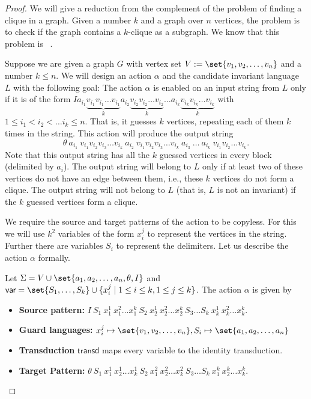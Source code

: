 \documentclass[12pt, a4paper]{article}
\newcommand{\var}{\textsf{var}}
\newcommand{\T}{\textsf{transd}}
\newcommand{\action}{\alpha}
\begin{document}
\begin{proof}
	We will give a reduction from the complement of the problem of finding a clique in a graph. Given a number $k$ and a graph over $n$
	vertices, the problem is to check if the graph contains a $k$-clique as a subgraph. We know that this problem is \npc\ \cite{K1972}.

Suppose we are given a graph $G$  with vertex set $V := \set{v_1, v_2, \dots, v_n}$ and  a number $k \leq 
n$. We will design an action $\action$ and the candidate invariant language $L$  with the following goal: The action $\action$  is enabled on an input string from $L$ only if it is of the form $ I a_{i_1} \underbrace{v_{i_1}v_{i_1}\dots 
v_{i_1}}_{k} a_{i_2} \underbrace{v_{i_2}v_{i_2}\dots 
v_{i_2}}_{k}\dots a_{i_k} \underbrace{v_{i_k}v_{i_k}\dots v_{i_k}}_{k}$  
with $1 \le i_1 < i_2 < \dots i_k \le n$.  That is, it guesses $k$ 
vertices, repeating each of them $k$ times in the string. This action 
will produce the output string $$\theta ~ a_{i_1} ~ v_{i_1} v_{i_2} 
v_{i_3} \dots v_{i_k} ~ a_{i_2} ~ v_{i_1}v_{i_2} v_{i_3} \dots  v_{i_k} ~ 
a_{i_3}~ \dots ~ a_{i_k} ~ v_{i_1}v_{i_2} \dots v_{i_k}. $$ Note that this 
output string has all the $k$ guessed vertices in every block 
(delimited by $a_i$). The output string will belong to $L$ only if at 
least two of these vertices do not have an edge between them, i.e., 
these $k$ vertices do not form a clique. The output string will not 
belong to $L$ (that is, $L$ is not an invariant) if the $k$ guessed 
vertices form a clique. 

We require the source and target patterns of the action to be copyless. For this we will use $k^2$ variables of the form $x_i^j$ to represent the vertices in the string. Further there are variables $S_i$ to represent the delimiters. Let us describe the action $\action$ formally.


Let $\Sigma = V \cup \set{a_1,a_2,\ldots, a_n, \theta, 
	I}$ and $\var=\set{S_1, \ldots, S_k} \cup \{x_i^j \mid  1 \le i \le k, 1 \le j 
\le k\}$. 
The  action $\action$ is given by
\begin{itemize}
	\item \textbf{Source pattern:} $I~S_1~x_1^1~x_1^2\dots x_1^{k}~ S_2~x_2^1~x_2^2\dots x_2^{k} ~S_3 \dots S_k~x_k^1~x_k^2\dots x_k^{k}$.
	\item \textbf{Guard languages:} $x_i^j \mapsto \set{v_1, v_2, \dots, v_n}, S_i \mapsto \set{a_1, a_2, \dots, a_n}$
	\item \textbf{Transduction} $\T$ maps every variable to the identity transduction.
	\item \textbf{Target Pattern:} $\theta ~ S_1 ~x_1^1 ~x_2^1 \dots  x_k^1~ 
	S_2 ~x_1^2 ~ x_2^2  \dots  x_k^2 ~S_3
	\dots
	S_k~x_1^{k}~x_2^{k}\dots x_k^k$.
\end{itemize}


\end{proof}
\end{document}
